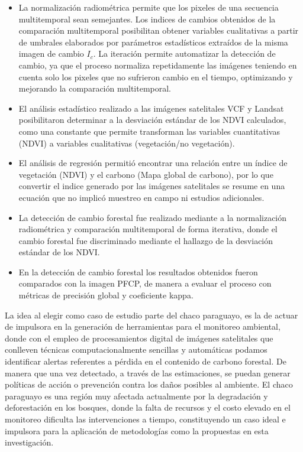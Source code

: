 \begin{itemize} 
\item La normalizaci\'on radiom\'etrica permite que los pixeles de una secuencia multitemporal sean semejantes. Los indices de cambios obtenidos de la comparaci\'on multitemporal posibilitan obtener variables cualitativas a partir de umbrales elaborados por par\'ametros estad\'isticos extra\'idos de la misma imagen de cambio $ I_{c} $. La iteraci\'on permite automatizar la detecci\'on de cambio, ya que el proceso normaliza repetidamente las im\'agenes teniendo en cuenta solo los pixeles que no sufrieron cambio en el tiempo, optimizando y mejorando la comparaci\'on multitemporal.
\item El an\'alisis estad\'istico realizado a las im\'agenes satelitales VCF y Landsat posibilitaron determinar a la desviaci\'on est\'andar de los NDVI calculados, como una constante que permite transforman las variables cuantitativas (NDVI) a variables cualitativas (vegetaci\'on/no vegetaci\'on).
\item El an\'alisis de regresi\'on permiti\'o encontrar una relaci\'on entre un \'indice de vegetaci\'on (NDVI) y el carbono (Mapa global de carbono), por lo que convertir el indice generado por las im\'agenes satelitales se resume en una ecuaci\'on que no implic\'o muestreo en campo ni estudios adicionales.
\item La detecci\'on de cambio forestal fue realizado mediante a la normalizaci\'on radiom\'etrica y comparaci\'on multitemporal de forma iterativa, donde el cambio forestal fue discriminado mediante el hallazgo de la desviaci\'on est\'andar de los NDVI. 
\item En la detecci\'on de cambio forestal los resultados obtenidos fueron comparados con la imagen PFCP, de manera a evaluar el proceso con m\'etricas de precisi\'on global y coeficiente kappa.
\end{itemize}
La idea al elegir como caso de estudio parte del chaco paraguayo, es la de actuar de impulsora en la generaci\'on de herramientas para el monitoreo ambiental, donde con el empleo de procesamientos digital de im\'agenes satelitales que conlleven t\'ecnicas computacionalmente sencillas y autom\'aticas podamos identificar alertas referentes a p\'erdida en el contenido de carbono forestal. De manera que una vez detectado, a trav\'es de las estimaciones, se puedan generar pol\'iticas de acci\'on o prevenci\'on contra los da\~{n}os posibles al ambiente. El chaco paraguayo es una regi\'on muy afectada actualmente por la degradaci\'on y deforestaci\'on en los bosques, donde la falta de recursos y el costo  elevado en el monitoreo dificulta las intervenciones a tiempo, constituyendo un caso ideal e impulsora para la aplicaci\'on de metodolog\'ias como la propuestas en esta investigaci\'on.

